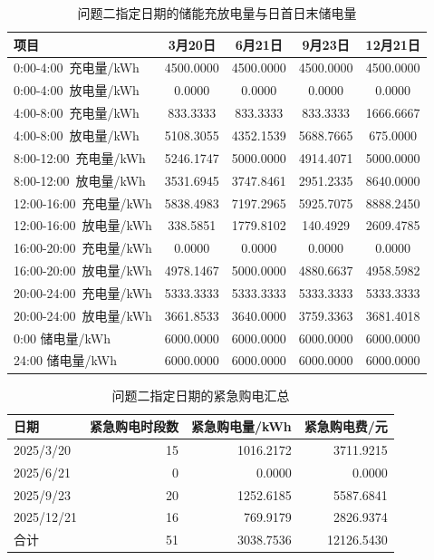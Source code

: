\begin{table}[H]
  \centering
  \caption{问题二指定日期的储能充放电量与日首日末储电量}
  \label{tab:q2-storage}
  \begin{tabular}{lcccc}
    \toprule
    项目 & 3月20日 & 6月21日 & 9月23日 & 12月21日 \\
    \midrule
    0:00-4:00\ 充电量/kWh & 4500.0000 & 4500.0000 & 4500.0000 & 4500.0000 \\
    0:00-4:00\ 放电量/kWh & 0.0000 & 0.0000 & 0.0000 & 0.0000 \\
    4:00-8:00\ 充电量/kWh & 833.3333 & 833.3333 & 833.3333 & 1666.6667 \\
    4:00-8:00\ 放电量/kWh & 5108.3055 & 4352.1539 & 5688.7665 & 675.0000 \\
    8:00-12:00\ 充电量/kWh & 5246.1747 & 5000.0000 & 4914.4071 & 5000.0000 \\
    8:00-12:00\ 放电量/kWh & 3531.6945 & 3747.8461 & 2951.2335 & 8640.0000 \\
    12:00-16:00\ 充电量/kWh & 5838.4983 & 7197.2965 & 5925.7075 & 8888.2450 \\
    12:00-16:00\ 放电量/kWh & 338.5851 & 1779.8102 & 140.4929 & 2609.4785 \\
    16:00-20:00\ 充电量/kWh & 0.0000 & 0.0000 & 0.0000 & 0.0000 \\
    16:00-20:00\ 放电量/kWh & 4978.1467 & 5000.0000 & 4880.6637 & 4958.5982 \\
    20:00-24:00\ 充电量/kWh & 5333.3333 & 5333.3333 & 5333.3333 & 5333.3333 \\
    20:00-24:00\ 放电量/kWh & 3661.8533 & 3640.0000 & 3759.3363 & 3681.4018 \\
    \midrule
    0:00 储电量/kWh & 6000.0000 & 6000.0000 & 6000.0000 & 6000.0000 \\
    24:00 储电量/kWh & 6000.0000 & 6000.0000 & 6000.0000 & 6000.0000 \\
    \bottomrule
  \end{tabular}
\end{table}

\begin{table}[H]
  \centering
  \caption{问题二指定日期的紧急购电汇总}
  \label{tab:q2-emergency}
  \begin{tabular}{lrrr}
    \toprule
    日期 & 紧急购电时段数 & 紧急购电量/kWh & 紧急购电费/元 \\
    \midrule
    2025/3/20 & 15 & 1016.2172 & 3711.9215 \\
    2025/6/21 & 0 & 0.0000 & 0.0000 \\
    2025/9/23 & 20 & 1252.6185 & 5587.6841 \\
    2025/12/21 & 16 & 769.9179 & 2826.9374 \\
    \midrule
    合计 & 51 & 3038.7536 & 12126.5430 \\
    \bottomrule
  \end{tabular}
\end{table}
